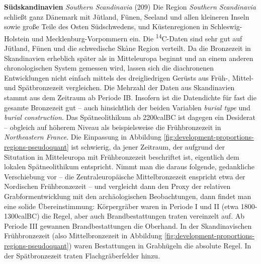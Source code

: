 \documentclass[openany,twoside,twocolumn]{book}
\begin{document}
\textbf{Südskandinavien} \emph{Southern Scandinavia} (209) \newline  Die
Region \emph{Southern Scandinavia} schließt ganz Dänemark mit Jütland,
Fünen, Seeland und allen kleineren Inseln sowie große Teile des Osten
Südschwedens, und Küstenregionen in Schleswig-Holstein und
Mecklenburg-Vorpommern ein. Die \textsuperscript{14}C-Daten sind sehr
gut auf Jütland, Fünen und die schwedische Skåne Region verteilt. Da die
Bronzezeit in Skandinavien erheblich später als in Mitteleuropa beginnt
und an einem anderen chronologischen System gemessen wird, lassen sich
die diachronenen Entwicklungen nicht einfach mittels des dreigliedrigen
Gerüsts aus Früh-, Mittel- und Spätbronzezeit vergleichen. Die Mehrzahl
der Daten aus Skandinavien stammt aus dem Zeitraum ab Periode IB.
Insofern ist die Datendichte für fast die gesamte Bronzezeit gut -- auch
hinsichtlich der beiden Variablen \emph{burial type} und \emph{burial
construction}. Das Spätneolithikum ab 2200calBC ist dagegen ein
Desiderat -- obgleich auf höherem Niveau als beispielsweise die
Frühbronzezeit in \emph{Northeastern France}. Die Einpassung in
Abbildung \ref{fig:development-proportions-regions-pseudoquant} ist
schwierig, da jener Zeitraum, der aufgrund der Situtation in
Mitteleuropa mit Frühbronzezeit beschriftet ist, eigentlich dem lokalen
Spätneolithikum entspricht. Nimmt man die daraus folgende, gedankliche
Verschiebung vor -- die Zentraleuropäische Mittelbronzezeit enspricht
etwa der Nordischen Frühbronzezeit -- und vergleicht dann den Proxy der
relativen Grabformentwicklung mit den archäologischen Beobachtungen,
dann findet man eine solide Übereinstimmung: Körpergräber waren in
Periode I und II (etwa 1800-1300calBC) die Regel, aber auch
Brandbestattungen traten vereinzelt auf. Ab Periode III gewannen
Brandbestattungen die Oberhand. In der Skandinavischen Frühbronzezeit
(also Mittelbronzezeit in Abbildung
\ref{fig:development-proportions-regions-pseudoquant}) waren
Bestattungen in Grabhügeln die absolute Regel. In der Spätbronzezeit
traten Flachgräberfelder hinzu.
\end{document}
